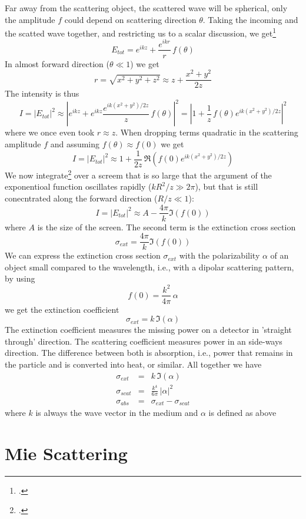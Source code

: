 Far away from the scattering object, the scattered wave will be spherical, only the amplitude $f$ could depend on scattering direction $\theta$. Taking the incoming and the scatted wave together, and restricting us to a scalar discussion, we get\footcite{Newton:1976cz}
\[
 E_{tot} =  e^{i k z} + \frac{e^{i k r}}{r} \, f(\theta)
\]
In almost forward direction ($\theta \ll 1$) we get
\[
r = \sqrt{x^2 + y^2 + z^2} \approx z + \frac{x^2 + y^2}{2z }
\]
The intensity is thus
\[
 I = |E_{tot}|^2 \approx \left|e^{i k z} + e^{i k z} \frac{e^{i k (x^2 + y^2)/2z }}{z} \, f(\theta) \right| ^2 = \left|1 + \frac{1}{z} \, f(\theta) e^{i k (x^2 + y^2)/2z } \right| ^2
\]
where we once even took $r \approx z$. When dropping terms quadratic in the scattering amplitude $f$ and assuming $f(\theta) \approx f(0)$ we get
\[
 I = |E_{tot}|^2 \approx 1 +   \frac{1}{2 z} \, \Re  \left( f(0) e^{i k (x^2 + y^2)/2z } \right)
\]
We now integrate\footcite{Newton:1976cz} over a screem that is so large that the argument of the exponentioal function oscillates rapidly ($k R^2 / z \gg 2 \pi$), but that is still conecntrated along the forward direction ($R/z \ll 1$):
\[
 I = |E_{tot}|^2 \approx A  - \frac{4 \pi }{k} \Im ( f(0) )
\]
where $A$ is the size of the screen. The second term is the extinction cross section
\[
 \sigma_{ext} = \frac{4 \pi }{k} \Im ( f(0) )
\]
We can express the extinction cross section $\sigma_{ext}$ with the polarizability $\alpha$ of an object small compared to the wavelength, i.e., with a dipolar scattering pattern, by using
\[
 f(0) = \frac{k^2}{4 \pi} \, \alpha
\]
we get the extinction coefficient
\[
 \sigma_{ext} = k \, \Im ( \alpha )
\]
The extinction coefficient measures the missing power on a detector in 'straight through' direction. The scattering coefficient measures power in an side-ways direction. The difference between both is absorption, i.e., power that remains in the particle and is converted into heat, or similar. All together we have
\begin{eqnarray}
 \sigma_{ext} &= &  k \, \Im ( \alpha ) \\
 \sigma_{scat} & = &  \frac{k^4}{6 \pi }  \, |\alpha|^2 \\
 \sigma_{abs}  &=&  \sigma_{ext} - \sigma_{scat}
\end{eqnarray}
where $k$ is always the wave vector in the medium and $\alpha$ is defined as above

\section{Mie Scattering}

